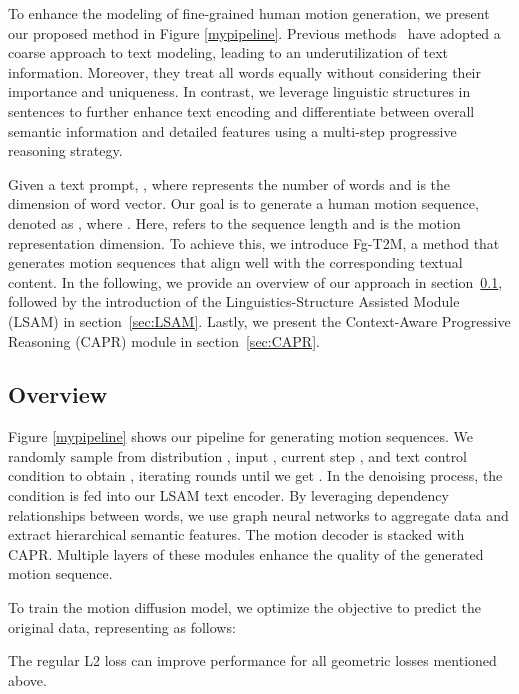 \documentclass[10pt,twocolumn,letterpaper]{article}
\begin{document}
To enhance the modeling of fine-grained human motion generation, we present our proposed method in Figure \ref{mypipeline}. Previous methods~\cite{ahn2018text2action,ahuja2019language2pose,ghosh2021synthesis} have adopted a coarse approach to text modeling, leading to an underutilization of text information. Moreover, they treat all words equally without considering their importance and uniqueness. In contrast, we leverage linguistic structures in sentences to further enhance text encoding and differentiate between overall semantic information and detailed features using a multi-step progressive reasoning strategy.

Given a text prompt, ,  where  represents the number of words and   is the dimension of word vector. 
Our goal is to generate a human motion sequence, denoted as , where . Here,  refers to the sequence length and  is the motion representation dimension. To achieve this, we introduce Fg-T2M, a method that generates motion sequences that align well with the corresponding textual content. In the following, we provide an overview of our approach in section~\ref{sec:architecture}, followed by the introduction of the Linguistics-Structure Assisted Module (LSAM) in section~\ref{sec:LSAM}. Lastly, we present the Context-Aware Progressive Reasoning (CAPR) module in section~\ref{sec:CAPR}.








\subsection{Overview}
\label{sec:architecture}




Figure \ref{mypipeline} shows our pipeline for generating motion sequences. We randomly sample  from distribution , input , current step , and text control condition  to obtain , iterating  rounds until we get . In the denoising process, the condition  is fed into our LSAM text encoder. By leveraging dependency relationships between words, we use graph neural networks to aggregate data and extract hierarchical semantic features. The motion decoder is stacked with CAPR. Multiple layers of these modules enhance the quality of the generated motion sequence.


To train the motion diffusion model, we optimize the objective to predict the original data, representing as follows:

The regular L2 loss can improve performance for all geometric losses mentioned above.
\end{document}
